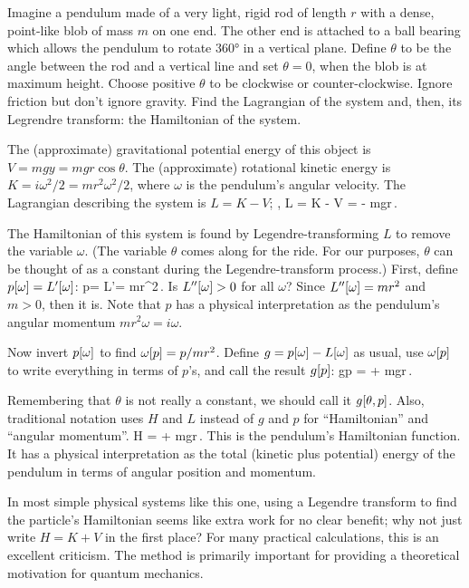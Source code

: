 \begin{example}
Imagine a pendulum made of a very light, rigid rod of length $r$ with a dense, point-like blob of mass $m$ on one end. The other end is attached to a ball bearing which allows the pendulum to rotate \ang{360} in a vertical plane. Define $\theta$ to be the angle between the rod and a vertical line and set $\theta = 0$, when the blob is at maximum height. Choose positive $\theta$ to be clockwise or counter-clockwise. Ignore friction but don't ignore gravity. Find the Lagrangian of the system and, then, its Legrendre transform: the Hamiltonian of the system.
\end{example}

\begin{solution}
The (approximate) gravitational potential energy of this object is $V = mgy = mgr\cos\theta$. The (approximate) rotational kinetic energy is $K = i\omega^2/2 = mr^2\omega^2/2$, where $\omega$ is the pendulum's angular velocity. The Lagrangian describing the system is $L = K - V$; \ie,
\beq
L\vat{\theta, \omega} = K - V =  - mgr\cos\theta\,.
\eeq

The Hamiltonian of this system is found by Legendre-transforming $L$ to remove the variable $\omega$. (The variable $\theta$ comes along for the ride. For our purposes, $\theta$ can be thought of as a constant during the Legendre-transform process.) First, define $p\!\left[{\omega}\right] = L'\!\left[{\omega}\right]$:
\beq
p\vat\omega = L'\vat\omega = mr^2\omega\,.
\eeq
Is $L''\!\left[{\omega}\right] > 0$ for all $\omega$? Since $L''\!\left[{\omega}\right] = mr^2$ and $m > 0$, then it is. Note that $p$ has a physical interpretation as the pendulum's angular momentum $mr^2\omega = i\omega$.

Now invert $p\!\left[{\omega}\right]$ to find $\omega\!\left[{p}\right] = p/mr^2$. Define $g = p\!\left[{\omega}\right] - L\!\left[{\omega}\right]$ as usual, use $\omega\!\left[{p}\right]$ to write everything in terms of $p$'s, and call the result $g\!\left[{p}\right]$:
\beq
g\vat p =  + mgr\cos\theta\,.
\eeq

Remembering that $\theta$ is not really a constant, we should call it $g\!\left[{\theta,p}\right]$. Also, traditional notation uses $H$ and $L$ instead of $g$ and $p$ for ``Hamiltonian'' and ``angular momentum''.
\beq
H =  + mgr\cos\theta\,.
\eeq
This is the pendulum's Hamiltonian function. It has a physical interpretation as the total (kinetic plus potential) energy of the pendulum in terms of angular position and momentum.

In most simple physical systems like this one, using a Legendre transform to find the particle's Hamiltonian seems like extra work for no clear benefit; why not just write $H = K + V$ in the first place? For many practical calculations, this is an excellent criticism. The method is primarily important for providing a theoretical motivation for quantum mechanics.
\end{solution}


